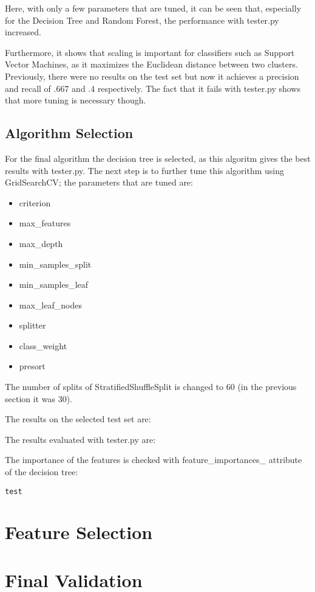 \documentclass[11pt]{article} %
\begin{document}
Here, with only a few parameters that are tuned, it can be seen that, especially for the Decision Tree and Random Forest, the performance with tester.py increased.

Furthermore, it shows that scaling is important for classifiers such as Support Vector Machines, as it maximizes the Euclidean distance between two clusters. Previously, there were no results on the test set but now it achieves a precision and recall of .667 and .4 respectively. The fact that it fails with tester.py shows that more tuning is necessary though.

\subsection{Algorithm Selection}
For the final algorithm the decision tree is selected, as this algoritm gives the best results with tester.py. The next step is to further tune this algorithm using {\selectfont GridSearchCV}; the parameters that are tuned are:
\begin{itemize}
\item criterion
\item  max\_features
\item  max\_depth
\item  min\_samples\_split
\item  min\_samples\_leaf
\item  max\_leaf\_nodes
\item  splitter
\item  class\_weight
\item  presort
\end{itemize}
The number of splits of {\selectfont StratifiedShuffleSplit} is changed to 60 (in the previous section it was 30).\medskip

The results on the selected test set are:

The results evaluated with tester.py are:

The importance of the features is checked with {\selectfont feature\_importances\_} attribute of the decision tree:
\begin{verbatim}
test 
\end{verbatim}

\section{Feature Selection}

\section{Final Validation}
\end{document}
